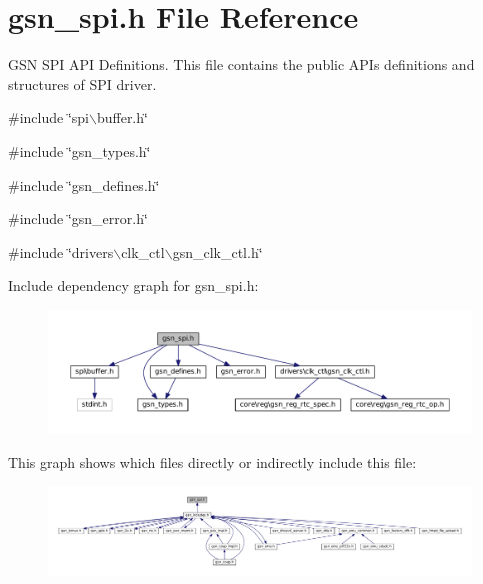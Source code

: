 \hypertarget{a00587}{
\section{gsn\_\-spi.h File Reference}
\label{a00587}
}


GSN SPI API Definitions. This file contains the public APIs definitions and structures of SPI driver.  


{\ttfamily \#include \char`\"{}spi$\backslash$buffer.h\char`\"{}}\par
{\ttfamily \#include \char`\"{}gsn\_\-types.h\char`\"{}}\par
{\ttfamily \#include \char`\"{}gsn\_\-defines.h\char`\"{}}\par
{\ttfamily \#include \char`\"{}gsn\_\-error.h\char`\"{}}\par
{\ttfamily \#include \char`\"{}drivers$\backslash$clk\_\-ctl$\backslash$gsn\_\-clk\_\-ctl.h\char`\"{}}\par
Include dependency graph for gsn\_\-spi.h:
\nopagebreak
\begin{figure}[H]
\begin{center}
\leavevmode
\includegraphics[width=400pt]{a00826}
\end{center}
\end{figure}
This graph shows which files directly or indirectly include this file:
\nopagebreak
\begin{figure}[H]
\begin{center}
\leavevmode
\includegraphics[width=400pt]{a00827}
\end{center}
\end{figure}
